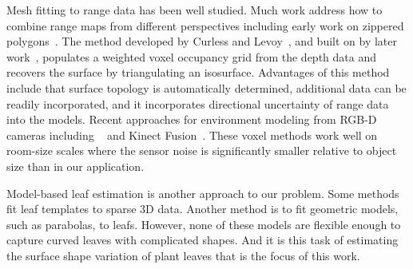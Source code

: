Mesh fitting to range data has been well studied.  Much work address how to combine range maps from different perspectives including early work on zippered polygons~\cite{Turk1994}.  The method developed by Curless and Levoy~\cite{Curless:1996}, and built on by later work~\cite{Izadi:2011,Newcombe:2011}, populates a weighted voxel occupancy grid from the depth data and recovers the surface by triangulating an isosurface.  Advantages of this method include that surface topology is automatically determined, additional data can be readily incorporated, and it incorporates directional uncertainty of range data into the models.  Recent approaches for environment modeling from RGB-D cameras including ~\cite{Xu2011} and Kinect Fusion~\cite{Izadi:2011,Newcombe:2011}.  These voxel methods work well on room-size scales where the sensor noise is significantly smaller relative to object size than in our application.  

Model-based leaf estimation is another approach to our problem.  Some methods~\cite{Quan:2006,Bradley:2013} fit leaf templates to sparse $3$D data.  Another method is to fit geometric models, such as parabolas, to leafs\cite{Alenya2011,Alenya2013}.  However, none of these models are flexible enough to capture curved leaves with complicated shapes.  And it is this task of estimating the surface shape variation of plant leaves that is the focus of this work.


